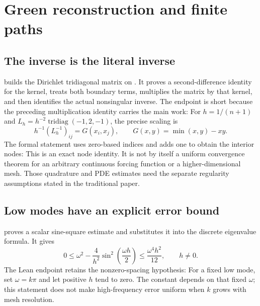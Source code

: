 \clearpage\section{Green reconstruction and finite paths}
\label{sec:green}
\subsection{The inverse is the literal inverse}
 builds the Dirichlet tridiagonal matrix on . It proves a second-difference identity for the kernel, treats both boundary terms, multiplies the matrix by that kernel, and then identifies the actual nonsingular inverse. The endpoint is short because the preceding multiplication identity carries the main work:
For $h=1/(n+1)$ and $L_h=h^{-2}\operatorname{tridiag}(-1,2,-1)$, the precise scaling is
\[
h^{-1}(L_h^{-1})_{ij}=G(x_i,x_j),\qquad G(x,y)=\min(x,y)-xy.
\]
The formal statement uses zero-based  indices and adds one to obtain the interior nodes:
This is an exact node identity. It is not by itself a uniform convergence theorem for an arbitrary continuous forcing function or a higher-dimensional mesh. Those quadrature and PDE estimates need the separate regularity assumptions stated in the traditional paper.

\subsection{Low modes have an explicit error bound}
 proves a scalar sine-square estimate and substitutes it into the discrete eigenvalue formula. It gives
\[
0\le \omega^2-\frac{4}{h^2}\sin^2\!\left(\frac{\omega h}{2}\right)
\le\frac{\omega^4h^2}{12},\qquad h\ne0.
\]
The Lean endpoint retains the nonzero-spacing hypothesis:
For a fixed low mode, set $\omega=k\pi$ and let positive $h$ tend to zero. The constant depends on that fixed $\omega$; this statement does not make high-frequency error uniform when $k$ grows with mesh resolution.

